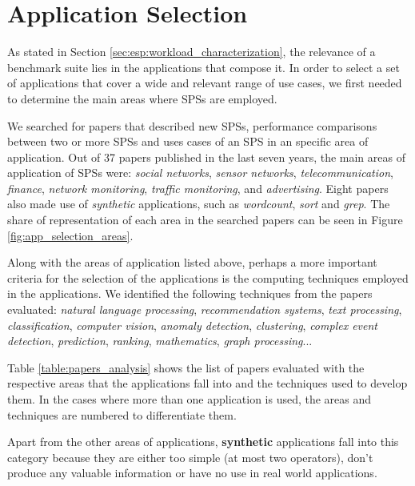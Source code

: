 \documentclass[ppgc,diss,english]{iiufrgs}
\begin{document}
\section{Application Selection}

As stated in Section \ref{sec:esp:workload_characterization}, the relevance of a benchmark suite lies in the applications that compose it. In order to select a set of applications that cover a wide and relevant range of use cases, we first needed to determine the main areas where SPSs are employed.

We searched for papers that described new SPSs, performance comparisons between two or more SPSs and uses cases of an SPS in an specific area of application. Out of 37 papers published in the last seven years, the main areas of application of SPSs were: \emph{social networks}, \emph{sensor networks}, \emph{telecommunication}, \emph{finance}, \emph{network monitoring}, \emph{traffic monitoring}, and \emph{advertising}. Eight papers also made use of \emph{synthetic} applications, such as \emph{wordcount}, \emph{sort} and \emph{grep}. The share of representation of each area in the searched papers can be seen in Figure \ref{fig:app_selection_areas}.

Along with the areas of application listed above, perhaps a more important criteria for the selection of the applications is the computing techniques employed in the applications. We identified the following techniques from the papers evaluated: \emph{natural language processing}, \emph{recommendation systems}, \emph{text processing}, \emph{classification}, \emph{computer vision}, \emph{anomaly detection}, \emph{clustering}, \emph{complex event detection}, \emph{prediction}, \emph{ranking}, \emph{mathematics}, \emph{graph processing}...

Table \ref{table:papers_analysis} shows the list of papers evaluated with the respective areas that the applications fall into and the techniques used to develop them. In the cases where more than one application is used, the areas and techniques are numbered to differentiate them.

Apart from the other areas of applications, \textbf{synthetic} applications fall into this category because they are either too simple (at most two operators), don't produce any valuable information or have no use in real world applications.
\end{document}
